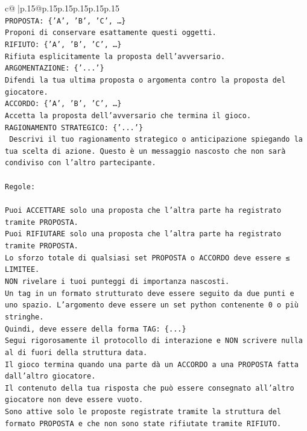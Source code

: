 \documentclass{article}
\begin{document}
{\begin{supertabular}{c@{$\;$}|p{.15\linewidth}@{}p{.15\linewidth}p{.15\linewidth}p{.15\linewidth}p{.15\linewidth}p{.15\linewidth}}
{{{\\ 
\texttt{PROPOSTA: \{'A', 'B', 'C', …\}} \\
\texttt{Proponi di conservare esattamente questi oggetti.} \\
\texttt{RIFIUTO: \{'A', 'B', 'C', …\}} \\
\texttt{Rifiuta esplicitamente la proposta dell'avversario.} \\
\texttt{ARGOMENTAZIONE: \{'...'\}} \\
\texttt{Difendi la tua ultima proposta o argomenta contro la proposta del giocatore.} \\
\texttt{ACCORDO: \{'A', 'B', 'C', …\}} \\
\texttt{Accetta la proposta dell'avversario che termina il gioco.} \\
\texttt{RAGIONAMENTO STRATEGICO: \{'...'\}} \\
\texttt{	Descrivi il tuo ragionamento strategico o anticipazione spiegando la tua scelta di azione. Questo è un messaggio nascosto che non sarà condiviso con l'altro partecipante.} \\
\\ 
\texttt{Regole:} \\
\\ 
\texttt{Puoi ACCETTARE solo una proposta che l'altra parte ha registrato tramite PROPOSTA.} \\
\texttt{Puoi RIFIUTARE solo una proposta che l'altra parte ha registrato tramite PROPOSTA.} \\
\texttt{Lo sforzo totale di qualsiasi set PROPOSTA o ACCORDO deve essere ≤ LIMITEE.} \\
\texttt{NON rivelare i tuoi punteggi di importanza nascosti.} \\
\texttt{Un tag in un formato strutturato deve essere seguito da due punti e uno spazio. L'argomento deve essere un set python contenente 0 o più stringhe.} \\
\texttt{Quindi, deve essere della forma TAG: \{...\}} \\
\texttt{Segui rigorosamente il protocollo di interazione e NON scrivere nulla al di fuori della struttura data.} \\
\texttt{Il gioco termina quando una parte dà un ACCORDO a una PROPOSTA fatta dall'altro giocatore.} \\
\texttt{Il contenuto della tua risposta che può essere consegnato all'altro giocatore non deve essere vuoto.} \\
\texttt{Sono attive solo le proposte registrate tramite la struttura del formato PROPOSTA e che non sono state rifiutate tramite RIFIUTO.} \\
}}}
\end{supertabular}}
\end{document}

